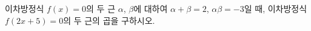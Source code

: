 이차방정식 $f(x)=0$의 두 근 $\alpha$, $\beta$에 대하여 $\alpha+\beta=2$, $\alpha\beta=-3$일 때, 이차방정식 $f(2x+5)=0$의 두 근의 곱을 구하시오.
